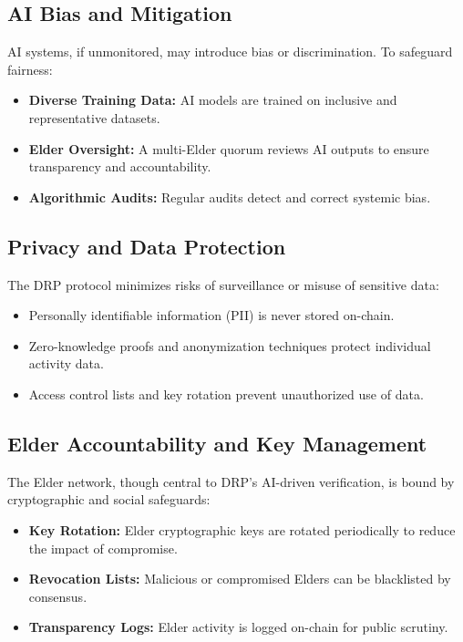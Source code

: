 \documentclass[11pt,a4paper]{article}
\begin{document}
\subsection{AI Bias and Mitigation}
AI systems, if unmonitored, may introduce bias or discrimination. To safeguard fairness:
\begin{itemize}
    \item \textbf{Diverse Training Data:} AI models are trained on inclusive and representative datasets.
    \item \textbf{Elder Oversight:} A multi-Elder quorum reviews AI outputs to ensure transparency and accountability.
    \item \textbf{Algorithmic Audits:} Regular audits detect and correct systemic bias.
\end{itemize}

\subsection{Privacy and Data Protection}
The DRP protocol minimizes risks of surveillance or misuse of sensitive data:
\begin{itemize}
    \item Personally identifiable information (PII) is never stored on-chain.
    \item Zero-knowledge proofs and anonymization techniques protect individual activity data.
    \item Access control lists and key rotation prevent unauthorized use of data.
\end{itemize}

\subsection{Elder Accountability and Key Management}
The Elder network, though central to DRP’s AI-driven verification, is bound by cryptographic and social safeguards:
\begin{itemize}
    \item \textbf{Key Rotation:} Elder cryptographic keys are rotated periodically to reduce the impact of compromise.
    \item \textbf{Revocation Lists:} Malicious or compromised Elders can be blacklisted by consensus.
    \item \textbf{Transparency Logs:} Elder activity is logged on-chain for public scrutiny.
\end{itemize}
\end{document}
